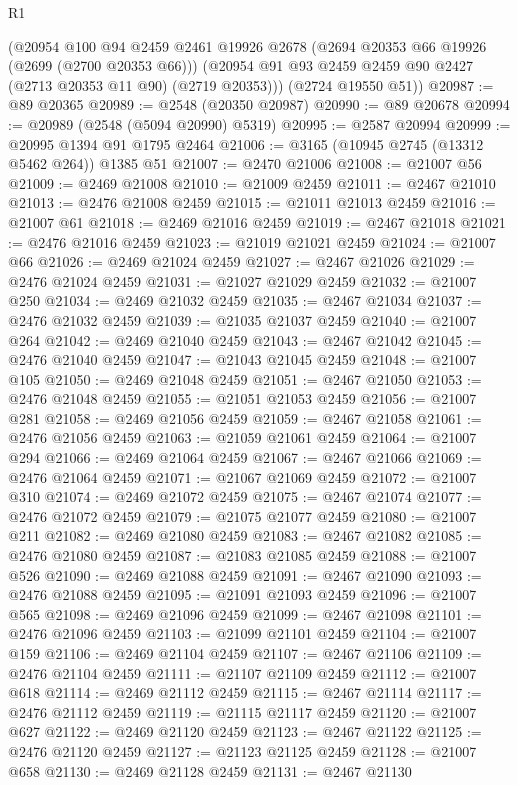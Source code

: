 \begin{lexlean}{R1}
\begin{coremodule}
      (@20954
        @100
        @94
        @2459
        @2461
        @19926
        @2678
        (@2694 @20353 @66 @19926 (@2699 (@2700 @20353 @66)))
        (@20954 @91 @93 @2459 @2459 @90 @2427 (@2713 @20353 @11 @90) (@2719 @20353)))
      (@2724 @19550 @51))
@20987 := @89 @20365
@20989 := @2548 (@20350 @20987)
@20990 := @89 @20678
@20994 := @20989 (@2548 (@5094 @20990) @5319)
@20995 := @2587 @20994
@20999 := @20995 @1394 @91 @1795 @2464
@21006 := @3165 (@10945 @2745 (@13312 @5462 @264)) @1385 @51
@21007 := @2470 @21006
@21008 := @21007 @56
@21009 := @2469 @21008
@21010 := @21009 @2459
@21011 := @2467 @21010
@21013 := @2476 @21008 @2459
@21015 := @21011 @21013 @2459
@21016 := @21007 @61
@21018 := @2469 @21016 @2459
@21019 := @2467 @21018
@21021 := @2476 @21016 @2459
@21023 := @21019 @21021 @2459
@21024 := @21007 @66
@21026 := @2469 @21024 @2459
@21027 := @2467 @21026
@21029 := @2476 @21024 @2459
@21031 := @21027 @21029 @2459
@21032 := @21007 @250
@21034 := @2469 @21032 @2459
@21035 := @2467 @21034
@21037 := @2476 @21032 @2459
@21039 := @21035 @21037 @2459
@21040 := @21007 @264
@21042 := @2469 @21040 @2459
@21043 := @2467 @21042
@21045 := @2476 @21040 @2459
@21047 := @21043 @21045 @2459
@21048 := @21007 @105
@21050 := @2469 @21048 @2459
@21051 := @2467 @21050
@21053 := @2476 @21048 @2459
@21055 := @21051 @21053 @2459
@21056 := @21007 @281
@21058 := @2469 @21056 @2459
@21059 := @2467 @21058
@21061 := @2476 @21056 @2459
@21063 := @21059 @21061 @2459
@21064 := @21007 @294
@21066 := @2469 @21064 @2459
@21067 := @2467 @21066
@21069 := @2476 @21064 @2459
@21071 := @21067 @21069 @2459
@21072 := @21007 @310
@21074 := @2469 @21072 @2459
@21075 := @2467 @21074
@21077 := @2476 @21072 @2459
@21079 := @21075 @21077 @2459
@21080 := @21007 @211
@21082 := @2469 @21080 @2459
@21083 := @2467 @21082
@21085 := @2476 @21080 @2459
@21087 := @21083 @21085 @2459
@21088 := @21007 @526
@21090 := @2469 @21088 @2459
@21091 := @2467 @21090
@21093 := @2476 @21088 @2459
@21095 := @21091 @21093 @2459
@21096 := @21007 @565
@21098 := @2469 @21096 @2459
@21099 := @2467 @21098
@21101 := @2476 @21096 @2459
@21103 := @21099 @21101 @2459
@21104 := @21007 @159
@21106 := @2469 @21104 @2459
@21107 := @2467 @21106
@21109 := @2476 @21104 @2459
@21111 := @21107 @21109 @2459
@21112 := @21007 @618
@21114 := @2469 @21112 @2459
@21115 := @2467 @21114
@21117 := @2476 @21112 @2459
@21119 := @21115 @21117 @2459
@21120 := @21007 @627
@21122 := @2469 @21120 @2459
@21123 := @2467 @21122
@21125 := @2476 @21120 @2459
@21127 := @21123 @21125 @2459
@21128 := @21007 @658
@21130 := @2469 @21128 @2459
@21131 := @2467 @21130

\end{coremodule}
\end{lexlean}
